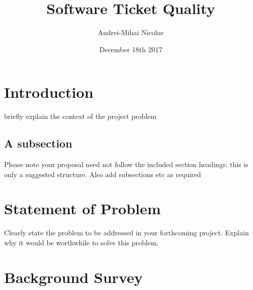 \documentclass{mprop}
\begin{document}
\title{Software Ticket Quality}
\author{Andrei-Mihai Nicolae}
\date{December 18th 2017}
\maketitle

\tableofcontents
\newpage

\section{Introduction}\label{intro}
briefly explain the context of the project problem


\subsection{A subsection}
Please note your proposal need not follow the included section headings; this is only a suggested structure. Also add subsections etc as required

\section{Statement of Problem}

Clearly state the problem to be addressed in your forthcoming project.
Explain why it would be worthwhile to solve this problem.

\section{Background Survey}
\end{document}
